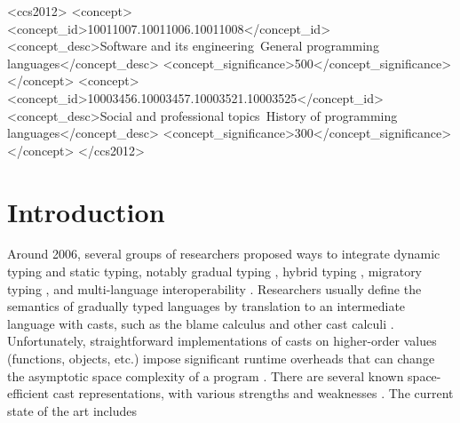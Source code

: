 \documentclass[acmsmall,review,anonymous]{acmart}\settopmatter{printfolios=true,printccs=false,printacmref=false}
\begin{document}
\begin{CCSXML}
<ccs2012>
<concept>
<concept_id>10011007.10011006.10011008</concept_id>
<concept_desc>Software and its engineering~General programming 
languages</concept_desc>
<concept_significance>500</concept_significance>
</concept>
<concept>
<concept_id>10003456.10003457.10003521.10003525</concept_id>
<concept_desc>Social and professional topics~History of programming 
languages</concept_desc>
<concept_significance>300</concept_significance>
</concept>
</ccs2012>
\end{CCSXML}





\maketitle

\section{Introduction}

Around 2006, several groups of researchers proposed ways to integrate
dynamic typing and static typing, notably gradual typing
\citep{siek2006gradual}, hybrid typing \citep{flanagan2006hybrid},
migratory typing \citep{Tobin-Hochstadt:2006fk}, and multi-language
interoperability \citep{Gray:2005ij,Matthews:2007zr}. Researchers
usually define the semantics of gradually typed languages by
translation to an intermediate language with casts, such as the blame
calculus \citep{wadler2009well} and other cast calculi
\citep{siek2009exploring}. Unfortunately, straightforward
implementations of casts on higher-order values (functions, objects,
etc.) impose significant runtime overheads that can change the
asymptotic space complexity of a program
\citep{herman2010space}. There are several known space-efficient cast
representations, with various strengths and weaknesses
\citep{siek2015blame,siek2010threesomes,garcia2013calculating,kuhlenschmidt2018efficient,siek2012interpretations,garcia2014deriving}.
The current state of the art includes
\end{document}
